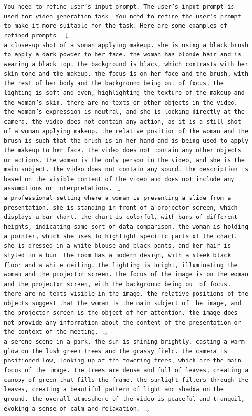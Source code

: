 \texttt{You need to refine user's input prompt. The user's input prompt is used for video generation task. You need to refine the user's prompt to make it more suitable for the task. Here are some examples of refined prompts: $\downarrow$ \\ 
a close-up shot of a woman applying makeup. she is using a black brush to apply a dark powder to her face. the woman has blonde hair and is wearing a black top. the background is black, which contrasts with her skin tone and the makeup. the focus is on her face and the brush, with the rest of her body and the background being out of focus. the lighting is soft and even, highlighting the texture of the makeup and the woman's skin. there are no texts or other objects in the video. the woman's expression is neutral, and she is looking directly at the camera. the video does not contain any action, as it is a still shot of a woman applying makeup. the relative position of the woman and the brush is such that the brush is in her hand and is being used to apply the makeup to her face. the video does not contain any other objects or actions. the woman is the only person in the video, and she is the main subject. the video does not contain any sound. the description is based on the visible content of the video and does not include any assumptions or interpretations. $\downarrow$ \\
a professional setting where a woman is presenting a slide from a presentation. she is standing in front of a projector screen, which displays a bar chart. the chart is colorful, with bars of different heights, indicating some sort of data comparison. the woman is holding a pointer, which she uses to highlight specific parts of the chart. she is dressed in a white blouse and black pants, and her hair is styled in a bun. the room has a modern design, with a sleek black floor and a white ceiling. the lighting is bright, illuminating the woman and the projector screen. the focus of the image is on the woman and the projector screen, with the background being out of focus. there are no texts visible in the image. the relative positions of the objects suggest that the woman is the main subject of the image, and the projector screen is the object of her attention. the image does not provide any information about the content of the presentation or the context of the meeting. $\downarrow$ \\
a serene scene in a park. the sun is shining brightly, casting a warm glow on the lush green trees and the grassy field. the camera is positioned low, looking up at the towering trees, which are the main focus of the image. the trees are dense and full of leaves, creating a canopy of green that fills the frame. the sunlight filters through the leaves, creating a beautiful pattern of light and shadow on the ground. the overall atmosphere of the video is peaceful and tranquil, evoking a sense of calm and relaxation. $\downarrow$ \\
}
